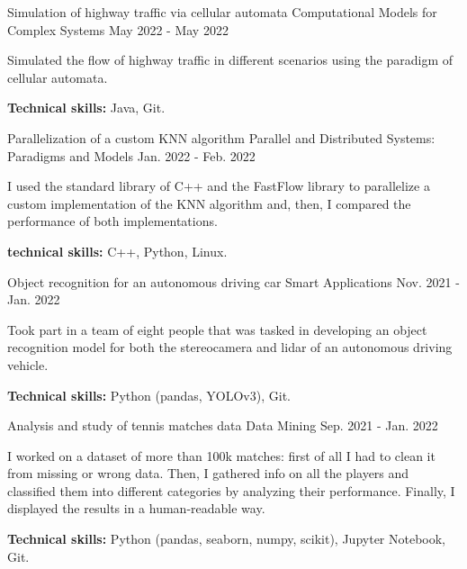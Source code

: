 \begin{cventries}
\cventry
{Simulation of highway traffic via cellular automata} %
{Computational Models for Complex Systems} %
{} %
{May 2022 - May 2022} %
{
    \begin{cvitems}
        \item{Simulated the flow of highway traffic in different scenarios using the paradigm of cellular automata.}
        \item{\textbf{Technical skills:} Java, Git.}
    \end{cvitems}
}

\cventry
{Parallelization of a custom KNN algorithm} %
{Parallel and Distributed Systems: Paradigms and Models} %
{} %
{Jan. 2022 - Feb. 2022} %
{
    \begin{cvitems}
        \item{I used the standard library of C++ and the FastFlow library to parallelize a custom implementation of the KNN algorithm and, then, I compared the performance of both implementations.}
        \item{\textbf{technical skills:} C++, Python, Linux.}
    \end{cvitems}
}

\cventry
{Object recognition for an autonomous driving car} %
{Smart Applications} %
{} %
{Nov. 2021 - Jan. 2022} %
{
    \begin{cvitems}
        \item{Took part in a team of eight people that was tasked in developing an object recognition model for both the stereocamera and lidar of an autonomous driving vehicle.}
        \item{\textbf{Technical skills:} Python (pandas, YOLOv3), Git.}
    \end{cvitems}
}

\cventry
{Analysis and study of tennis matches data} %
{Data Mining} %
{} %
{Sep. 2021 - Jan. 2022} %
{
    \begin{cvitems}
        \item {I worked on a dataset of more than 100k matches: first of all I had to clean it from missing or wrong data. Then, I gathered info on all the players and classified them into different categories by analyzing their performance. Finally, I displayed the results in a human-readable way.}
        \item{\textbf{Technical skills:} Python (pandas, seaborn, numpy, scikit), Jupyter Notebook, Git.}
    \end{cvitems}
}


\end{cventries}
